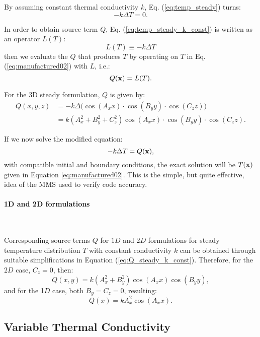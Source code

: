 \documentclass[a4paper,10pt]{article}
\begin{document}
By assuming constant thermal conductivity $k$, Eq. (\ref{eq:temp_steady}) turns:
\begin{equation}
\label{eq:temp_steady_k_const}
 -k \Delta T = 0.
\end{equation}

In order to obtain source term $Q$,  Eq. (\ref{eq:temp_steady_k_const}) is written as an operator $L(T)$:
\begin{equation}
\label{eq:L_steady_k_const}
  L(T)\equiv -k \Delta T
\end{equation}
then we evaluate the $Q$ that produces $T$ by operating on $T$ in Eq. (\ref{eq:manufactured02}) with $L$, i.e.:
$$Q({\bf x}) = L(T).$$

For the 3D steady formulation, $Q$ is given by:
\begin{equation}
\label{eq:Q_steady_k_const}
\begin{split}
 Q(x,y,z) &=  -k \Delta \big( \cos(A_x x ) \cdot \cos(B_y y ) \cdot \cos(C_z z ) \big) \\
	    &=  k (A_x^2+B_y^2+C_z^2) \cos(A_x x)\cdot\cos(B_y y)\cdot\cos(C_z z).
\end{split}
\end{equation}

If we now solve the modified equation:
\begin{equation}
 -k \Delta T =  Q({\bf x}),
\end{equation}
with compatible initial and boundary conditions, the exact solution will be $T({\bf x})$ given in Equation \ref{eq:manufactured02}. This is the simple, but quite effective, idea of the MMS used to verify code accuracy.

\paragraph{1D and 2D formulations}\


Corresponding source terms $Q$ for $1D$ and $2D$ formulations for steady temperature distribution $T$ with constant
conductivity $k$ can be obtained through suitable simplifications in Equation (\ref{eq:Q_steady_k_const}).
Therefore, for the $2D$ case, $C_z=0$, then:
\begin{equation*}
\displaystyle
Q(x,y) =k(A_{x} ^2+B_{y} ^2) \cos(A_{x} x)\cos(B_{y} y),
\end{equation*}
%
and for the 1$D$ case, both $B_y=C_z=0$, resulting:
$$Q(x) =k A_{x} ^2  \cos(A_{x} x).$$


\subsection{Variable Thermal Conductivity}
\end{document}
